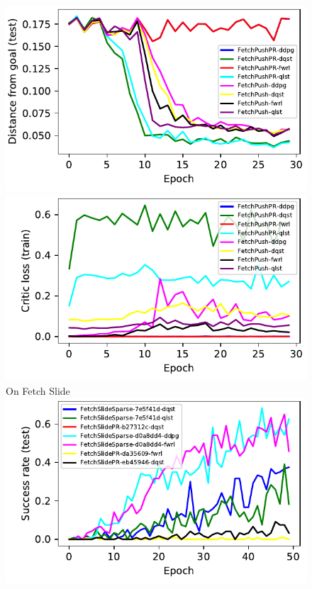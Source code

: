 \begin{figure}
  \includegraphics[width=\frac\columnwidth]{./media/res/be0910c-her_fwrl_path_reward-FetchPushPR-v1-fwrl/test/ag_g_dist.pdf}%
  \includegraphics[width=\frac\columnwidth]{./media/res/be0910c-her_fwrl_path_reward-FetchPushPR-v1-fwrl/train/critic_loss.pdf}\\
  On Fetch Slide\\
  \includegraphics[width=\frac\columnwidth]{./media/res/eb45946-path_reward-FetchSlidePR-v1-dqst/test/success_rate.pdf}%

\end{figure}
